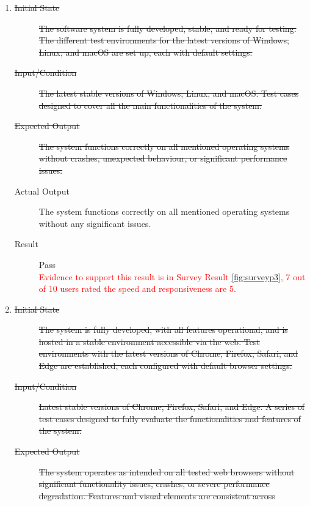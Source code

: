 \documentclass[12pt, titlepage]{article}
\newcommand{\rt}[1]{\textcolor{red}{#1}}
\begin{document}
\begin{enumerate}[NFR-T1]
  \item \label{NFRT16}
    \begin{description}
    \item[\sout{Initial State}]\sout{ The software system is fully developed, stable, and ready
      for testing. The different test environments for the latest versions of
      Windows, Linux, and macOS are set up, each with default settings.
    }
		\item[\sout{Input/Condition}]\sout{ The latest stable versions of Windows, Linux, and
      macOS. Test cases designed to cover all the main functionalities of the
      system.
    }
		\item[\sout{Expected Output}]\sout{ The system functions correctly on all mentioned
      operating systems without crashes, unexpected behaviour, or significant
      performance issues.
    }
		\item[Actual Output] The system functions correctly on all mentioned operating
      systems without any significant issues.
    \item[Result] Pass \\
    \rt{ Evidence to support this result is in Survey Result \ref{fig:surveyp3}, 7 out of 10 users rated the speed and responsiveness are 5. }
    \end{description}
  \item \label{NFRT17}
    \begin{description}
    \item[\sout{Initial State}]\sout{ The system is fully developed, with all features
      operational, and is hosted in a stable environment accessible via the web.
      Test environments with the latest versions of Chrome, Firefox, Safari, and
      Edge are established, each configured with default browser settings.
    }
		\item[\sout{Input/Condition}]\sout{ Latest stable versions of Chrome, Firefox, Safari, and
      Edge. A series of test cases designed to fully evaluate the
      functionalities and features of the system.
    }
		\item[\sout{Expected Output}]\sout{ The system operates as intended on all tested web
      browsers without significant functionality issues, crashes, or severe
      performance degradation. Features and visual elements are consistent across
}
\end{description}
\end{enumerate}
\end{document}
